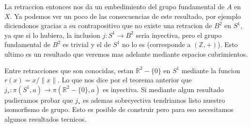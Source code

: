 La retraccion entonces nos da un embedimiento del grupo fundamental de
\( A \) en \(X\). Ya podemos ver un poco de las consecuencias de este
resultado, por ejemplo diciendonos gracias a su contrapositivo que no
existe una retracion de \(B^2\) en \(S^1\), ya que si lo hubiera, la
inclusion \(j : S^1 \to B^2\) seria inyectiva, pero el grupo fundamental
de \(B^2\) es trivial y el de \(S^1\) no lo es (corresponde a \((\mathbb
Z, +)\)). Esto ultimo es un resultado que veremos mas adelante
mediante espacios cubrimientos.

Entre retracciones que son conocidas, estan \(\mathbb R ^2 - \{0\}\) en
\(S^1\) mediante la funcion \(r (x) = x / \lVert x \rVert \). Lo que nos
dice por el teorema anterior que \(j_{*} : \pi (S^1, a) \to \pi (\mathbb
R ^2 - \{0\}, a)\) es inyectiva. Si mediante algun resultado pudieramos
probar que \(j_{*}\) es ademas sobreyectiva tendriamos listo nuestro
isomorfismo de grupo. Esto es posible de construir pero para eso
necesitamos algunos resultados tecnicos.

